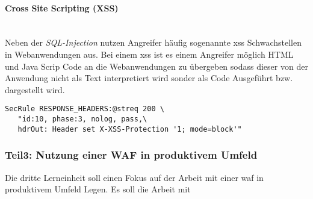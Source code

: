 \paragraph{Cross Site Scripting (XSS)}\ \\

Neben der \textit{SQL-Injection} nutzen Angreifer häufig sogenannte \ac{xss} Schwachstellen in Webanwendungen aus.
Bei einem \ac{xss} ist es einem Angreifer möglich HTML und Java Scrip Code an die Webanwendungen zu übergeben sodass dieser von der Anwendung nicht als Text interpretiert wird sonder als Code Ausgeführt bzw. dargestellt wird.


\begin{verbatim}
SecRule RESPONSE_HEADERS:@streq 200 \
   "id:10, phase:3, nolog, pass,\
   hdrOut: Header set X-XSS-Protection '1; mode=block'"
\end{verbatim}


\subsubsection{Teil3: Nutzung einer WAF in produktivem Umfeld}
\label{sec:learning-unit-3-meta}

Die dritte Lerneinheit soll einen Fokus auf der Arbeit mit einer \ac{waf} in produktivem Umfeld Legen.
Es soll die Arbeit mit 
